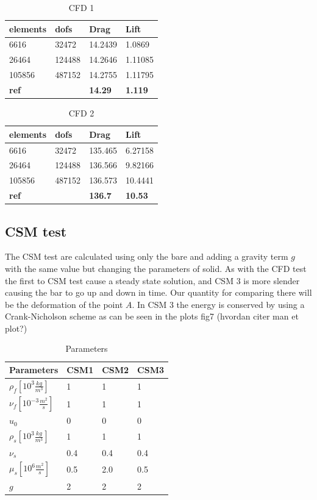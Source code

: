 \begin{table}[h!]
\centering
\caption{CFD 1}
\label{my-label}
\begin{tabular}{|l|l|l|l|}
\hline
\textbf{elements} & \textbf{dofs} & \textbf{Drag} & \textbf{Lift} \\ \hline
6616 & 32472 & 14.2439 & 1.0869 \\ \hline
26464 & 124488 & 14.2646 & 1.11085 \\ \hline
105856 & 487152 & 14.2755 & 1.11795 \\ \hline
\textbf{ref} & \textbf{} & \textbf{14.29} & \textbf{1.119} \\ \hline
\end{tabular}
\end{table}

\begin{table}[h!]
\centering
\caption{CFD 2}
\label{my-label}
\begin{tabular}{|l|l|l|l|}
\hline
\textbf{elements} & \textbf{dofs} & \textbf{Drag} & \textbf{Lift} \\ \hline
6616 & 32472 & 135.465 & 6.27158 \\ \hline
26464 & 124488 & 136.566 & 9.82166 \\ \hline
105856 & 487152 & 136.573 & 10.4441 \\ \hline
\textbf{ref} & \textbf{} & \textbf{136.7} & \textbf{10.53} \\ \hline
\end{tabular}
\end{table}

\subsection*{CSM test}
The CSM test are calculated using only the bare and adding a gravity term $g$ with the same value but changing the parameters of solid.
As with the CFD test the first to CSM test cause a steady state solution, and CSM 3 is more slender causing the bar to go up and down in time. Our quantity for comparing there will be the deformation of the point $A$. In CSM 3 the energy is conserved by using a Crank-Nicholson scheme as can be seen in the plots fig7 (hvordan citer man et plot?)

\begin{table}[h!]
\centering
\caption{Parameters}
\label{my-label}
\begin{tabular}{|l|l|l|l|}
\hline
Parameters & CSM1 & CSM2 & CSM3 \\ \hline
$\rho_f[10^3 \frac{kg}{m^3}]$ & 1 & 1 & 1 \\ \hline
$\nu_f [10^{-3} \frac{m^2}{s}]$ & 1 & 1 & 1 \\ \hline
$u_0$ & 0 & 0 & 0 \\ \hline
$\rho_s[10^3 \frac{kg}{m^3}]$ & 1 & 1 & 1 \\ \hline
$\nu_s$ & 0.4 & 0.4 & 0.4 \\ \hline
$\mu_s[10^6 \frac{m^2}{s}]$ & 0.5 & 2.0 & 0.5 \\ \hline
$g $ & 2 & 2 & 2 \\ \hline
\end{tabular}
\end{table}

